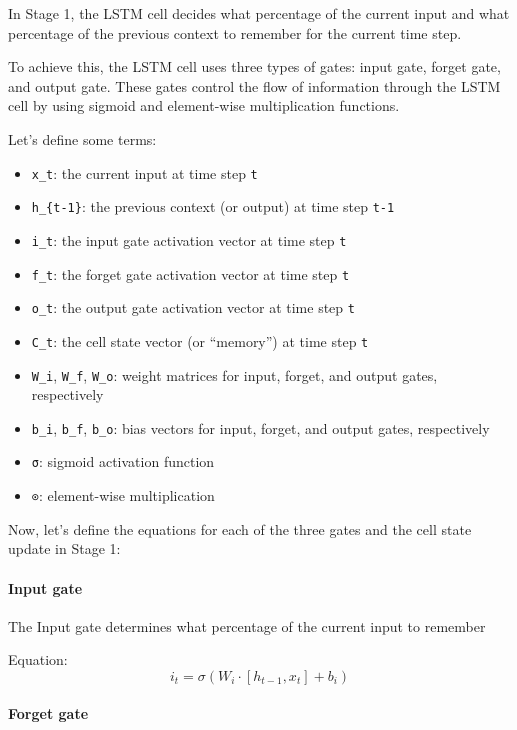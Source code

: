 \documentclass[
]{article}
\providecommand{\tightlist}{%
  \setlength{\itemsep}{0pt}\setlength{\parskip}{0pt}}
\begin{document}
In Stage 1, the LSTM cell decides what percentage of the current input
and what percentage of the previous context to remember for the current
time step.

To achieve this, the LSTM cell uses three types of gates: input gate,
forget gate, and output gate. These gates control the flow of
information through the LSTM cell by using sigmoid and element-wise
multiplication functions.

Let's define some terms:

\begin{itemize}
\tightlist
\item
  \texttt{x\_t}: the current input at time step \texttt{t}
\item
  \texttt{h\_\{t-1\}}: the previous context (or output) at time step
  \texttt{t-1}
\item
  \texttt{i\_t}: the input gate activation vector at time step
  \texttt{t}
\item
  \texttt{f\_t}: the forget gate activation vector at time step
  \texttt{t}
\item
  \texttt{o\_t}: the output gate activation vector at time step
  \texttt{t}
\item
  \texttt{C\_t}: the cell state vector (or ``memory'') at time step
  \texttt{t}
\item
  \texttt{W\_i}, \texttt{W\_f}, \texttt{W\_o}: weight matrices for
  input, forget, and output gates, respectively
\item
  \texttt{b\_i}, \texttt{b\_f}, \texttt{b\_o}: bias vectors for input,
  forget, and output gates, respectively
\item
  \texttt{σ}: sigmoid activation function
\item
  \texttt{⊙}: element-wise multiplication
\end{itemize}

Now, let's define the equations for each of the three gates and the cell
state update in Stage 1:

\hypertarget{input-gate-1}{%
\paragraph{Input gate}\label{input-gate-1}}

The Input gate determines what percentage of the current input to
remember

Equation: \[ i_t = \sigma(W_i \cdot [h_{t-1}, x_t] + b_i) \]

\hypertarget{forget-gate-1}{%
\paragraph{Forget gate}\label{forget-gate-1}}
\end{document}
